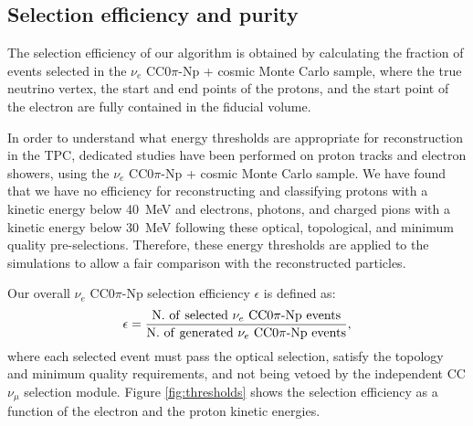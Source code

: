 \subsection{Selection efficiency and purity}\label{sec:eff}
The selection efficiency of our algorithm is obtained by calculating the fraction of events selected in the $\nu_{e}$ CC$0\pi$-Np + cosmic Monte Carlo sample, where the true neutrino vertex, the start and end points of the protons, and the start point of the electron are fully contained in the fiducial volume.

In order to understand what energy thresholds are appropriate for reconstruction in the TPC, dedicated studies have been performed on proton tracks and electron showers, using the $\nu_{e}$ CC$0\pi$-Np + cosmic Monte Carlo sample. We have found that we have no efficiency for reconstructing and classifying protons {with a kinetic energy} below 40~MeV and electrons{, photons, and charged pions} {with a kinetic energy} below 30~MeV following these optical, topological, and minimum quality pre-selections. Therefore, these energy thresholds are applied to the simulations to allow a fair comparison with the reconstructed particles. 

Our overall $\nu_{e}$ CC$0\pi$-Np selection efficiency $\epsilon$ is defined as:
\begin{equation}
\epsilon = \frac{\mathrm{N.~of~selected~}\nu_{e}\mathrm{~CC0}\pi\mathrm{{\text -}Np~events}}{\mathrm{N.~of~generated~}\nu_{e}\mathrm{~CC0}\pi\mathrm{{\text -}Np~events}},
\end{equation}
where each selected event must pass the optical selection, satisfy the topology and minimum quality requirements, and not being vetoed by the independent CC $\nu_{\mu}$ selection module. Figure \ref{fig:thresholds} shows the selection efficiency as a function of the electron and the proton kinetic energies. 

